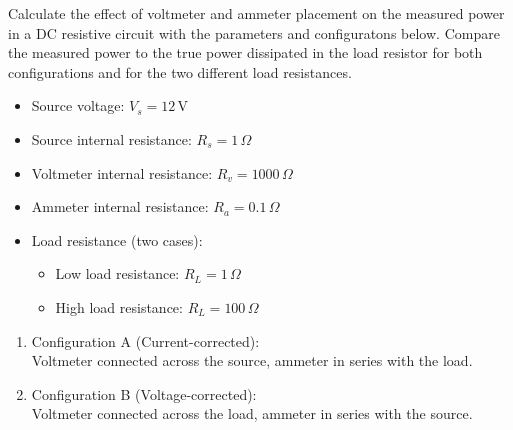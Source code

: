 \documentclass[11pt,a4paper]{article}
\newcounter{exercise}
\newenvironment{exercise}[1][]
  {\refstepcounter{exercise}%
   \begin{tcolorbox}[enhanced, breakable, width=\textwidth,
     colback=blue!5!white,colframe=blue!60!black,
     fonttitle=\bfseries\large,
     title=Exercise~\theexercise:~#1]}
  {\end{tcolorbox}}
\begin{document}
\begin{exercise}[Power Measurement]
Calculate the effect of voltmeter and ammeter placement on the measured power in a DC resistive circuit with the parameters and configuratons below. Compare the measured power to the true power dissipated in the load resistor for both configurations and for the two different load resistances.

\begin{itemize}
  \item Source voltage: $V_s = 12\, \mathrm{V}$
  \item Source internal resistance: $R_s = 1\, \Omega$
  \item Voltmeter internal resistance: $R_v = 1000\, \Omega$
  \item Ammeter internal resistance: $R_a = 0.1\, \Omega$
  \item Load resistance (two cases):
  \begin{itemize}
      \item Low load resistance: $R_L =  1\, \Omega$
      \item High load resistance: $R_L = 100\, \Omega$
  \end{itemize}
\end{itemize}

\begin{enumerate}
  \item Configuration A (Current-corrected):\\
  Voltmeter connected across the source, ammeter in series with the load.\\

\begin{center}
\end{center}

  \item Configuration B (Voltage-corrected):\\
  Voltmeter connected across the load, ammeter in series with the source.\\
\end{enumerate}
\end{exercise}
\end{document}
